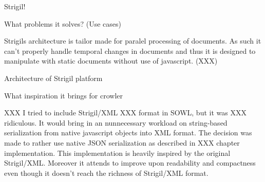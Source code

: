 \sec Strigil!


\secc What problems it solves? (Use cases)

Strigils architecture is tailor made for paralel processing of documents. As
such it can't properly handle temporal changes in documents and thus it is
designed to manipulate with static documents without use of javascript. (XXX)

\secc Architecture of Strigil platform

\secc What inspiration it brings for crowler

XXX I tried to include Strigil/XML XXX format in SOWL, but it was XXX
ridiculous. It would bring in an nunnecessary workload on string-based
serialization from native javascript objects into XML format. The decision was
made to rather use native JSON serialization as described in XXX chapter
implementation. This implementation is heavily inspired by the original
Strigil/XML. Moreover it attends to improve upon readability and compactness
even though it doesn't reach the richness of Strigil/XML format. 

%






